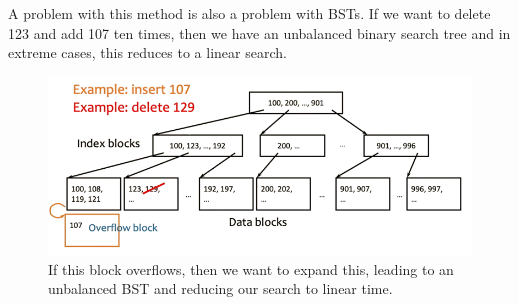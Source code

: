     A problem with this method is also a problem with BSTs. If we want to delete 123 and add 107 ten times, then we have an unbalanced binary search tree and in extreme cases, this reduces to a linear search. 

    \begin{figure}[H]
      \centering 
      \includegraphics[scale=0.4]{img/isam_problem.png}
      \caption{If this block overflows, then we want to expand this, leading to an unbalanced BST and reducing our search to linear time.} 
      \label{fig:isam_problem}
    \end{figure}
    

